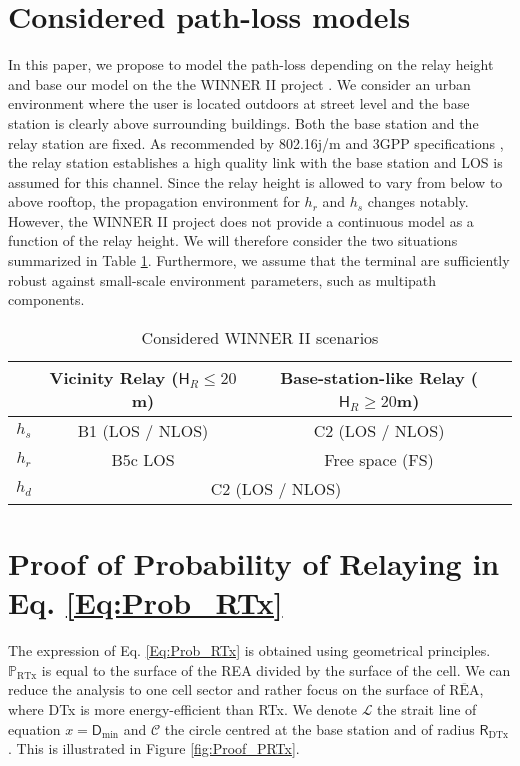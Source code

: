\documentclass[journal]{IEEEtran}
\theoremstyle{definition}
\begin{document}
\appendices


\section{Considered path-loss models}
\label{App:pathloss}

In this paper, we propose to model the path-loss depending on the relay height and base our model on the the WINNER II project \cite{winner}. 
We consider an urban environment where the user is located outdoors at street level and the base station is clearly above surrounding buildings.
Both the base station and the relay station are fixed. As recommended by 802.16j/m and 3GPP specifications \cite{hr_LOS}, the relay station establishes a high quality link with the base station and LOS is assumed for this channel. Since the relay height is allowed to vary from below to above rooftop, the propagation environment for $h_r$ and $h_s$ changes notably. However, the WINNER II project does not provide a continuous model as a function of the relay height. We will therefore consider the two situations summarized in Table \ref{sim_pathloss}.
Furthermore, we assume that the terminal are sufficiently robust against small-scale environment parameters, such as multipath components.


\begin{table}
\centering  \begin{tabular}{|c|c|c|} 
\hline
& Vicinity Relay ($\mathsf{H}_R \leq 20$m) & Base-station-like Relay ($\mathsf{H}_R \geq 20$m)\\
\hline
$h_s$ & B1 (LOS / NLOS) &  C2 (LOS / NLOS)\\
$h_r$ & B5c LOS & Free space (FS) \\
$h_d$ &\multicolumn{2}{|c|}{C2 (LOS / NLOS)} \\
\hline
\end{tabular}
\caption{Considered WINNER II scenarios} 
\label{sim_pathloss}
\end{table}

\section{Proof of Probability of Relaying in Eq. \eqref{Eq:Prob_RTx}}
\label{appendix:P_RTx}

The expression of Eq. \eqref{Eq:Prob_RTx} is obtained using geometrical principles. $\mathbb{P}_{\text{RTx}}$  is equal to the surface of the REA divided by the surface of the cell. We can reduce the analysis to one cell sector and rather focus on the surface of $\overline{\text{REA}}$, where DTx is more energy-efficient than RTx.
We denote $\mathcal{L}$ the strait line of equation $ x=\mathsf{D}_{\min}$ and $\mathcal{C}$ the circle centred at the base station and of radius $\mathsf{R}_{\text{DTx}}$.
This is illustrated in Figure \ref{fig:Proof_PRTx}.
\end{document}
